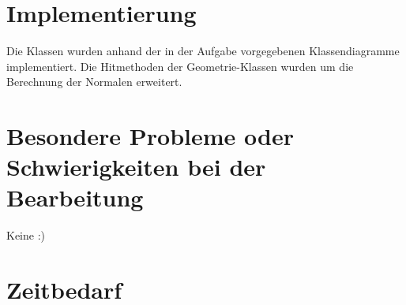 \documentclass[a4paper,parskip=half,11pt]{scrartcl}
\begin{document}
\section*{Implementierung}

Die Klassen wurden anhand der in der Aufgabe vorgegebenen Klassendiagramme implementiert.
Die Hitmethoden der Geometrie-Klassen wurden um die Berechnung der Normalen erweitert.

\section*{Besondere Probleme oder Schwierigkeiten bei der Bearbeitung}
Keine :)

\section*{Zeitbedarf}
\end{document}
